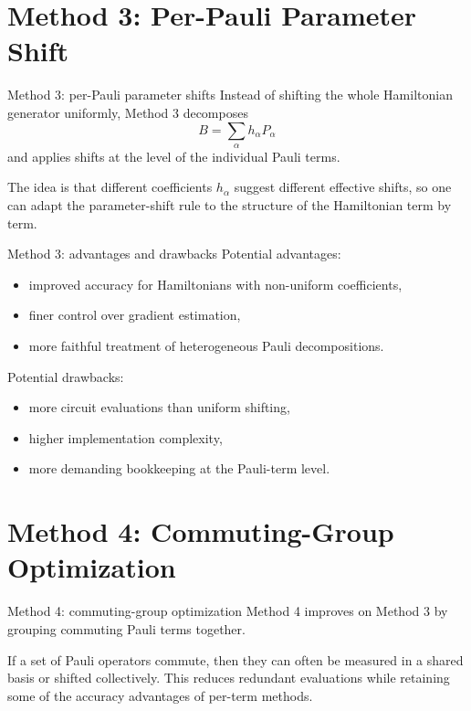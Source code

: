 \documentclass[aspectratio=169]{beamer}
\begin{document}
\section{Method 3: Per-Pauli Parameter Shift}

\begin{frame}{Method 3: per-Pauli parameter shifts}
Instead of shifting the whole Hamiltonian generator uniformly, Method 3 decomposes
\[
B = \sum_\alpha h_\alpha P_\alpha
\]
and applies shifts at the level of the individual Pauli terms.

The idea is that different coefficients \(h_\alpha\) suggest different effective shifts, so one can adapt the parameter-shift rule to the structure of the Hamiltonian term by term.
\end{frame}

\begin{frame}{Method 3: advantages and drawbacks}
Potential advantages:
\begin{itemize}
\item improved accuracy for Hamiltonians with non-uniform coefficients,
\item finer control over gradient estimation,
\item more faithful treatment of heterogeneous Pauli decompositions.
\end{itemize}

Potential drawbacks:
\begin{itemize}
\item more circuit evaluations than uniform shifting,
\item higher implementation complexity,
\item more demanding bookkeeping at the Pauli-term level.
\end{itemize}
\end{frame}

\section{Method 4: Commuting-Group Optimization}

\begin{frame}{Method 4: commuting-group optimization}
Method 4 improves on Method 3 by grouping commuting Pauli terms together.

If a set of Pauli operators commute, then they can often be measured in a shared basis or shifted collectively.
This reduces redundant evaluations while retaining some of the accuracy advantages of per-term methods.
\end{frame}
\end{document}
